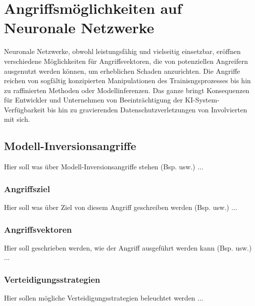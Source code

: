 \section{Angriffsmöglichkeiten auf Neuronale Netzwerke} \label{chpt:Stand_der_Technik_Angriffe}
Neuronale Netzwerke, obwohl leistungsfähig und vielseitig einsetzbar, eröffnen verschiedene Möglichkeiten für Angriffsvektoren, die von potenziellen Angreifern ausgenutzt werden können, um erheblichen Schaden anzurichten. Die Angriffe reichen von sogfältig konzipierten Manipulationen des Trainisngsprozesses bis hin zu raffinierten Methoden oder Modellinferenzen. Das ganze bringt  Konsequenzen für Entwickler und Unternehmen von Beeinträchtigung der KI-System-Verfügbarkeit bis hin zu gravierenden Datenschutzverletzungen von Involvierten mit sich.

\subsection{Modell-Inversionsangriffe}
Hier soll was über Modell-Inversionsangriffe stehen (Bsp. usw.) ...
\subsubsection{Angriffsziel}
Hier soll was über Ziel von diesem Angriff geschreiben werden (Bsp. usw.) ...
\subsubsection{Angriffsvektoren}
Hier soll geschrieben werden, wie der Angriff ausgeführt werden kann (Bsp. usw.) ...
\subsubsection{Verteidigungsstrategien}{\label{diff_privacy}}
Hier sollen mögliche Verteidigungsstrategien beleuchtet werden ...
